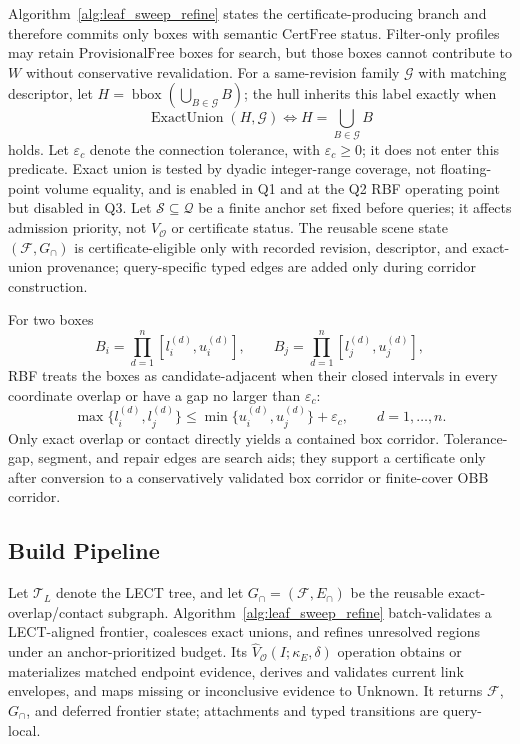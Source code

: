 \documentclass[journal]{IEEEtran}
\newcommand{\rbf}{RBF}
\newcommand{\calO}{\ensuremath{\mathcal{O}}}
\newcommand{\Q}{\ensuremath{\mathcal{Q}}}
\begin{document}
Algorithm~\ref{alg:leaf_sweep_refine} states the certificate-producing branch
and therefore commits only boxes with semantic $\mathrm{CertFree}$ status.
Filter-only profiles may retain $\mathrm{ProvisionalFree}$ boxes for search, but
those boxes cannot contribute to $W$ without conservative revalidation. For a
same-revision family $\mathcal{G}$
with matching descriptor,
let $H=\operatorname{bbox}(\bigcup_{B\in\mathcal{G}}B)$; the hull inherits this
label exactly when
\[
\operatorname{ExactUnion}(H,\mathcal{G})
\Longleftrightarrow H=\bigcup_{B\in\mathcal{G}}B
\]
holds. Let $\varepsilon_c$ denote the connection tolerance, with
$\varepsilon_c\ge0$; it does not enter this predicate. Exact union is tested by
dyadic integer-range coverage, not floating-point volume equality, and is
enabled in Q1 and at the Q2 \rbf{} operating point but disabled in Q3. Let
$\mathcal{S}\subseteq\Q$ be a finite
anchor set fixed before queries; it affects admission priority, not
$V_{\calO}$ or certificate status. The reusable scene state
$(\mathcal{F},G_\cap)$ is certificate-eligible only with recorded revision,
descriptor, and exact-union provenance; query-specific typed edges are added
only during corridor construction.

For two boxes
\[
B_i=\prod_{d=1}^{n}[l_i^{(d)},u_i^{(d)}],\qquad
B_j=\prod_{d=1}^{n}[l_j^{(d)},u_j^{(d)}],
\]
\rbf{} treats the boxes as candidate-adjacent when their closed intervals in
every coordinate overlap or have a gap no larger than \(\varepsilon_c\):
\[
\max\{l_i^{(d)},l_j^{(d)}\}
\le
\min\{u_i^{(d)},u_j^{(d)}\}+\varepsilon_c,\qquad d=1,\ldots,n.
\]
Only exact overlap or contact directly yields a contained box corridor.
Tolerance-gap, segment, and repair edges are search aids; they support a
certificate only after conversion to a conservatively validated box corridor
or finite-cover OBB corridor.

\subsection{Build Pipeline}

Let $\mathcal{T}_L$ denote the LECT tree, and let
$G_\cap=(\mathcal{F},E_\cap)$ be the reusable exact-overlap/contact subgraph.
Algorithm~\ref{alg:leaf_sweep_refine} batch-validates a LECT-aligned frontier,
coalesces exact unions, and refines unresolved regions under an anchor-prioritized
budget. Its $\widehat V_{\calO}(I;\kappa_E,\delta)$ operation obtains or
materializes matched endpoint evidence, derives and validates current link
envelopes, and maps missing or inconclusive evidence to $\mathrm{Unknown}$.
It returns $\mathcal{F}$, $G_\cap$, and deferred frontier state; attachments and
typed transitions are query-local.
\end{document}
